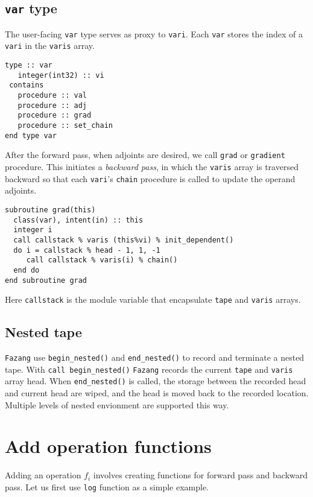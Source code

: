 \documentclass[12pt, reqno, oneside]{amsbook}
\numberwithin{equation}{chapter}
\begin{document}
\section{\texttt{var} type}
\label{sec:orgf8b9d4f}
The user-facing \texttt{var} type serves as proxy to \texttt{vari}. Each \texttt{var}
stores the index of a \texttt{vari} in the \texttt{varis} array.
\begin{verbatim}
type :: var
   integer(int32) :: vi
 contains
   procedure :: val
   procedure :: adj
   procedure :: grad
   procedure :: set_chain
end type var
\end{verbatim}
After the forward pass, when adjoints are desired, we call \texttt{grad} or
\texttt{gradient} procedure. This initiates a \emph{backward pass}, in which  the
\texttt{varis} array is traversed backward
so that each \texttt{vari}'s \texttt{chain} procedure is called to update the
operand adjoints.
\begin{verbatim}
subroutine grad(this)
  class(var), intent(in) :: this
  integer i
  call callstack % varis (this%vi) % init_dependent()
  do i = callstack % head - 1, 1, -1
     call callstack % varis(i) % chain()
  end do
end subroutine grad
\end{verbatim}
Here \texttt{callstack} is the module variable that encapsulate \texttt{tape} and
\texttt{varis} arrays.

\section{Nested tape}
\label{sec:orgde2db32}
\texttt{Fazang} use \texttt{begin\_nested()} and \texttt{end\_nested()} to record and
terminate a nested tape. With \texttt{call begin\_nested()} \texttt{Fazang} records
the current \texttt{tape} and \texttt{varis} array head. When \texttt{end\_nested()} is
called, the storage between the recorded head and current head are
wiped, and the head is moved back to the recorded location. Multiple
levels of nested envionment are supported this way.

\chapter{Add operation functions}
\label{sec:org0c57838}
Adding an operation \(f_i\) involves creating functions for forward
pass and backward pass. Let us first use \texttt{log} function as a simple
example.
\end{document}
